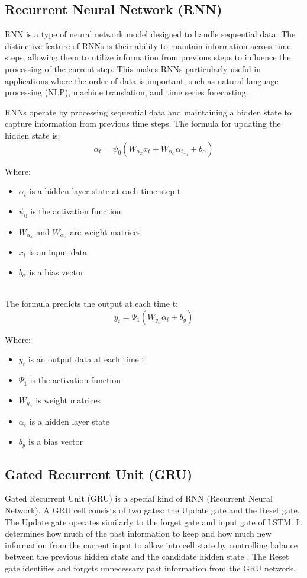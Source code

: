 \documentclass{ieeeojies}
\begin{document}
\subsection{Recurrent Neural Network (RNN)}
RNN is a type of neural network model designed to handle sequential data. The distinctive feature of RNNs is their ability to maintain information across time steps, allowing them to utilize information from previous steps to influence the processing of the current step. This makes RNNs particularly useful in applications where the order of data is important, such as natural language processing (NLP), machine translation, and time series forecasting.

RNNs operate by processing sequential data and maintaining a hidden state to capture information from previous time steps. The formula for updating the hidden state is:
\[ \alpha_t=\psi_0(W_\alpha_xx_t + W_\alpha_\alpha\alpha_t_-_1 + b_\alpha) \]

Where:\\
    \begin{itemize}
        \item $\alpha_t$ is a hidden layer state at each time step t
        \item $\psi_0$ is the activation function
        \item $W_\alpha_x$ and $W_\alpha_\alpha$ are weight matrices
        \item $x_t$ is an input data
        \item $b_\alpha$ is a bias vector
    \end{itemize}\\

The formula predicts the output at each time t:\\
\[ y_t = \Psi_1(W_y_\alpha\alpha_t + b_y) \]

Where:\\
    \begin{itemize}
        \item $y_t$ is an output data at each time t
        \item $\Psi_1$ is the activation function
        \item $W_y_\alpha$ is weight matrices
        \item $\alpha_t$ is a hidden layer state
        \item $b_y$ is a bias vector
        \cite{zargar2021introduction}
    \end{itemize}

\subsection{Gated Recurrent Unit (GRU)} 
Gated Recurrent Unit (GRU) is a special kind of RNN (Recurrent Neural Network). A GRU cell consists of two gates: the Update gate and the Reset gate. The Update gate operates similarly to the forget gate and input gate of LSTM. It determines how much of the past information to keep and how much new information from the current input to allow into cell state by controlling balance between the previous hidden state and the candidate hidden state \cite{gru_balance}. The Reset gate identifies and forgets unnecessary past information from the GRU network.
\end{document}
